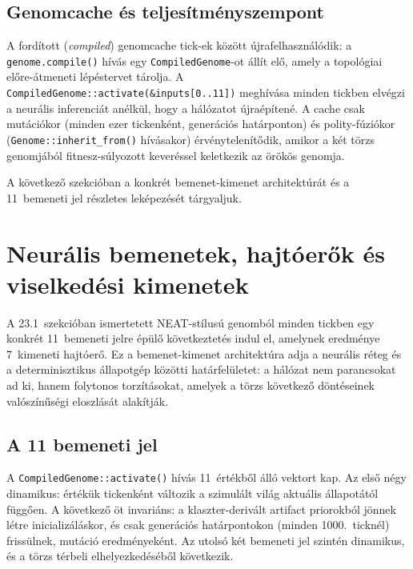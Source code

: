 ﻿\documentclass[a4paper,12pt]{report}
\begin{document}
\subsection*{Genomcache és teljesítményszempont}

A fordított (\textit{compiled}) genomcache tick-ek között újrafelhasználódik:
a \texttt{genome.compile()} hívás egy \texttt{CompiledGenome}-ot állít elő,
amely a topológiai előre-átmeneti lépéstervet tárolja.
A \texttt{CompiledGenome::activate(\&inputs[0..11])} meghívása minden tickben elvégzi
a neurális inferenciát anélkül, hogy a hálózatot újraépítené.
A cache csak mutációkor (minden ezer tickenként, generációs határponton)
és polity-fúziókor (\texttt{Genome::inherit\_from()} hívásakor) érvénytelenítődik,
amikor a két törzs genomjából fitnesz-súlyozott keveréssel keletkezik az örökös genomja.

A következő szekcióban a konkrét bemenet-kimenet architektúrát és a 11~bemeneti jel
részletes leképezését tárgyaljuk.

\section{Neurális bemenetek, hajtóerők és viselkedési kimenetek}
\label{sec:neurosim-25-drives}

A 23.1~szekcióban ismertetett NEAT-stílusú genomból minden tickben egy konkrét
11~bemeneti jelre épülő következtetés indul el, amelynek eredménye 7~kimeneti hajtóerő.
Ez a bem\-enet-kimenet architektúra adja a neurális réteg és a determinisztikus
állapotgép közötti határfelületet: a hálózat nem parancsokat ad ki, hanem folytonos
torzításokat, amelyek a törzs következő döntéseinek valószínűségi eloszlását alakítják.

\subsection*{A 11 bemeneti jel}

A \texttt{CompiledGenome::activate()} hívás 11~értékből álló vektort kap.
Az első négy dinamikus: értékük tickenként változik a szimulált világ aktuális
állapotától függően. A következő öt invariáns: a klaszter-derivált artifact priorokból
jönnek létre inicializáláskor, és csak generációs határpontokon (minden 1000.~ticknél)
frissülnek, mutáció eredményeként. Az utolsó két bemeneti jel szintén dinamikus,
és a törzs térbeli elhelyezkedéséből következik.
\end{document}

